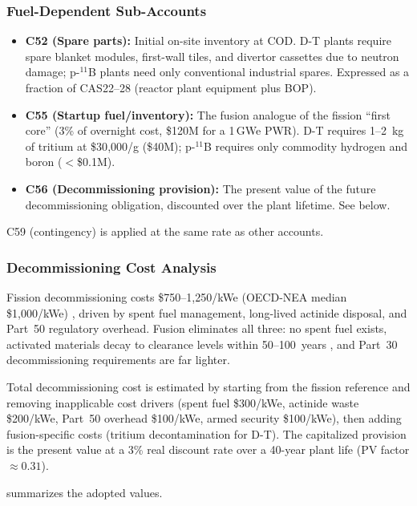 \documentclass{article}
\begin{document}
\subsubsection{Fuel-Dependent Sub-Accounts}
\begin{itemize}
\item \textbf{C52 (Spare parts):} Initial on-site inventory at COD.
  D-T plants require spare blanket modules, first-wall tiles, and
  divertor cassettes due to neutron damage; p-${}^{11}$B plants need
  only conventional industrial spares. Expressed as a fraction of
  CAS22--28 (reactor plant equipment plus BOP).
\item \textbf{C55 (Startup fuel/inventory):} The fusion analogue of
  the fission ``first core'' (3\% of overnight cost,
  \$120M for a 1\,GWe PWR). D-T requires 1--2~kg of tritium at
  \$30{,}000/g (\$40M); p-${}^{11}$B requires only
  commodity hydrogen and boron ($<$\$0.1M).
\item \textbf{C56 (Decommissioning provision):} The present value of
  the future decommissioning obligation, discounted over the plant
  lifetime. See below.
\end{itemize}

\noindent C59 (contingency) is applied at the same rate as other
accounts.

\subsubsection{Decommissioning Cost Analysis}
Fission decommissioning costs \$750--1{,}250/kWe (OECD-NEA median
\$1{,}000/kWe) \citep{oecd_nea_decom2016}, driven by spent fuel
management, long-lived actinide disposal, and Part~50 regulatory
overhead. Fusion eliminates all three: no spent fuel exists, activated
materials decay to clearance levels within 50--100~years
\citep{iaea_fusion_decom2020}, and Part~30 decommissioning requirements
are far lighter.

Total decommissioning cost is estimated by starting from the fission
reference and removing inapplicable cost drivers (spent fuel
\$300/kWe, actinide waste \$200/kWe, Part~50 overhead
\$100/kWe, armed security \$100/kWe), then adding
fusion-specific costs (tritium decontamination for D-T). The
capitalized provision is the present value at a 3\% real discount
rate over a 40-year plant life (PV factor $\approx 0.31$).

 summarizes the adopted values.
\end{document}

